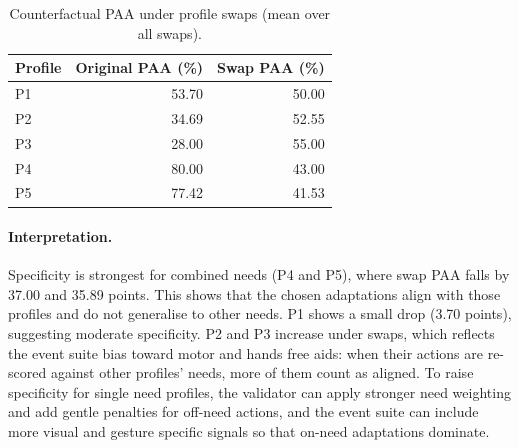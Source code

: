 \begin{table}[ht]
\centering
\caption{Counterfactual PAA under profile swaps (mean over all swaps).}
\label{tab:swap}
\begin{tabular}{lrr}
\toprule
\textbf{Profile} & \textbf{Original PAA (\%)} & \textbf{Swap PAA (\%)} \\
\midrule
P1 & 53.70 & 50.00 \\
P2 & 34.69 & 52.55 \\
P3 & 28.00 & 55.00 \\
P4 & 80.00 & 43.00 \\
P5 & 77.42 & 41.53 \\
\bottomrule
\end{tabular}
\end{table}

\paragraph{Interpretation.}
Specificity is strongest for combined needs (P4 and P5), where swap PAA falls by 37.00 and 35.89 points. This shows that the chosen adaptations align with those profiles and do not generalise to other needs. P1 shows a small drop (3.70 points), suggesting moderate specificity. P2 and P3 increase under swaps, which reflects the event suite bias toward motor and hands free aids: when their actions are re-scored against other profiles’ needs, more of them count as aligned. To raise specificity for single need profiles, the validator can apply stronger need weighting and add gentle penalties for off-need actions, and the event suite can include more visual and gesture specific signals so that on-need adaptations dominate.



